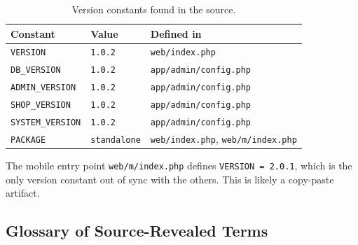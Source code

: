 \documentclass[11pt,a4paper]{article}
\begin{document}
\begin{table}[htbp]
\centering
\caption{Version constants found in the source.}\label{tab:versions}
\small
\begin{tabularx}{\columnwidth}{llX}
\toprule
\textbf{Constant} & \textbf{Value} & \textbf{Defined in} \\
\midrule
\texttt{VERSION}        & \texttt{1.0.2} & \texttt{web/index.php} \\
\texttt{DB\_VERSION}    & \texttt{1.0.2} & \texttt{app/admin/config.php} \\
\texttt{ADMIN\_VERSION} & \texttt{1.0.2} & \texttt{app/admin/config.php} \\
\texttt{SHOP\_VERSION}  & \texttt{1.0.2} & \texttt{app/admin/config.php} \\
\texttt{SYSTEM\_VERSION} & \texttt{1.0.2} & \texttt{app/admin/config.php} \\
\texttt{PACKAGE}        & \texttt{standalone} & \texttt{web/index.php}, \texttt{web/m/index.php} \\
\bottomrule
\end{tabularx}
\end{table}

The mobile entry point \texttt{web/m/index.php} defines
\texttt{VERSION = 2.0.1}, which is the only version constant out
of sync with the others. This is likely a copy-paste artifact.

\subsection{Glossary of Source-Revealed Terms}
\end{document}
